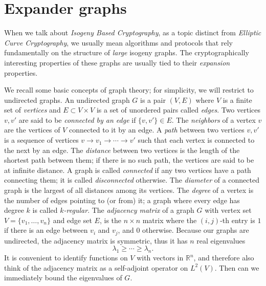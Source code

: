 \documentclass[10pt]{article}
\theoremstyle{plain}
\theoremstyle{definition}
\begin{document}


\section{Expander graphs}

When we talk about \emph{Isogeny Based Cryptography}, as a topic
distinct from \emph{Elliptic Curve Cryptography}, we usually mean
algorithms and protocols that rely fundamentally on the structure of
\emph{large} isogeny graphs. %
The cryptographically interesting properties of these graphs are
usually tied to their \emph{expansion} properties. %

We recall some basic concepts of graph theory; for simplicity, we will
restrict to undirected graphs. %
An undirected graph $G$ is a pair $(V,E)$ where $V$ is a finite set of
\emph{vertices} and $E⊂V×V$ is a set of unordered pairs called
\emph{edges}. %
Two vertices $v,v'$ are said to be \emph{connected by an edge} if
$\{v,v'\}∈E$. %
The \emph{neighbors} of a vertex $v$ are the vertices of $V$ connected
to it by an edge. %
A \emph{path} between two vertices $v,v'$ is a sequence of vertices
$v\to v_1\to\cdots\to v'$ such that each vertex is connected to the
next by an edge. %
The \emph{distance} between two vertices is the length of the shortest
path between them; if there is no such path, the vertices are said to
be at infinite distance. %
A graph is called \emph{connected} if any two vertices have a path
connecting them; it is called \emph{disconnected} otherwise. %
The \emph{diameter} of a connected graph is the largest of all
distances among its vertices. %
The \emph{degree} of a vertex is the number of edges pointing to (or
from) it; a graph where every edge has degree $k$ is called
\emph{$k$-regular}. %
The \emph{adjacency matrix} of a graph $G$ with vertex set
$V=\{v_1,\dots,v_n\}$ and edge set $E$, is the $n×n$ matrix where the
$(i,j)$-th entry is $1$ if there is an edge between $v_i$ and $v_j$,
and $0$ otherwise. %
Because our graphs are undirected, the adjacency matrix is symmetric,
thus it has $n$ real eigenvalues
\[λ_1≥\cdots≥λ_n.\] %
It is convenient to identify functions on $V$ with vectors in $ℝ^n$,
and therefore also think of the adjacency matrix as a self-adjoint
operator on $L^2(V)$. %
Then can we immediately bound the eigenvalues of $G$.
\end{document}
